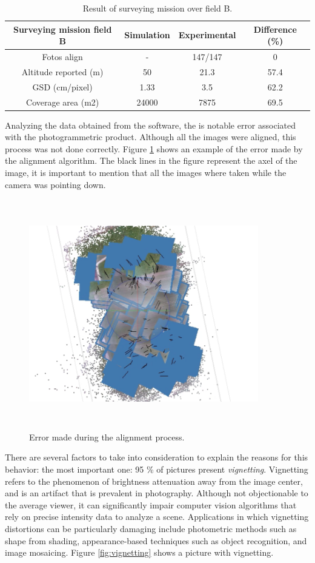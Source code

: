 \begin{table}[H]
\centering
\begin{tabular}{|c|c|c|c|}
\hline
Surveying mission field B & Simulation & Experimental & Difference (\%) \\ \hline
Fotos align               & -          & 147/147      & 0          \\ \hline
Altitude reported (m)     & 50         & 21.3         & 57.4       \\ \hline
GSD (cm/pixel)            & 1.33       & 3.5          & 62.2       \\ \hline
Coverage area (m2)        & 24000      & 7875         & 69.5       \\ \hline
\end{tabular}
\caption{Result of surveying mission over field B.}
\label{Table:ResultsB}
\end{table}
Analyzing the data obtained from the software, the is notable error associated with the photogrammetric product. Although all the images were aligned, this process was not done correctly. Figure \ref{fig:error} shows an example of the error made by the alignment algorithm. The black lines in the figure represent the axel of the image, it is important to mention that all the images where taken while the camera was pointing down.
\begin{figure}[H]
\centering
\includegraphics[width=10cm,height=10cm,keepaspectratio]{imagenes/error.png}
\caption{ Error made during the alignment process.}
\label{fig:error}
\end{figure}

There are several factors to take into consideration to explain the reasons for this behavior: the most important one: 95 \% of pictures present \textit{vignetting}. Vignetting refers to the phenomenon of brightness attenuation away from the image center, and is an artifact that is prevalent in photography. Although not objectionable to the average viewer, it can significantly impair computer vision algorithms that rely on precise intensity data to analyze a scene. Applications in which vignetting distortions can be particularly damaging include photometric methods such as shape from shading, appearance-based techniques such as object recognition, and image mosaicing.  Figure \ref{fig:vignetting} shows a picture with vignetting.\cite{4663074}

